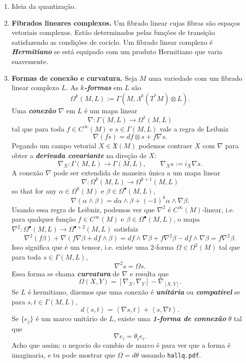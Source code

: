\begin{enumerate}
\begin{proof}\leavevmode
\begin{align*}
	\frac{d}{dt}\left<A\psi(t),\psi(t)\right>&=\left<\frac{1}{i\hslash}A\hat{H}\psi,\psi\right>+\left<A\psi,\frac{1}{i\hslash}\hat{H}\psi\right>=\frac{1}{i\hslash}\left<[A,\hat{H}]\psi,\psi\right>
\end{align*}
já que o produto é hermitiano, i.e. em particular, antilinear na segunda entrada.
\end{proof}
Isso justifica que o commutador é o análogo do colchete de Poisson.
\item Ideia da quantização.
\item \textbf{Fibrados lineares complexos.} Um fibrado linear cujas fibras são espaços vetoriais complexos. Estão determinados pelas funções de transição satisfazendo as condições de cociclo. Um fibrado linear complexo é \textit{\textbf{Hermitiano}} se está equipado com um produto Hermitiano que varia suavemente.
\item \textbf{Formas de conexão e curvatura.} Seja $M$ uma variedade com um fibrado linear complexo $L$. As \textit{\textbf{$k$-formas}} em $L$ são
	\[\Omega^{k}(M,L):=\Gamma(M,\Lambda^{k}(T^*M)\otimes L).\]
Uma \textit{\textbf{conexão}} $\nabla$ em $L$ é um mapa linear
\[\nabla:\Gamma(M,L)\to\Omega^{1}(M,L)\]
tal que para toda $f\in C^\infty(M)$ e $s \in \Gamma(M,L)$ vale a regra de Leibniz
\[\nabla(fs)=df\otimes s+f\nabla s.\]
Pegando um campo vetorial $X \in \mathfrak{X}(M)$ podemos contraer $X$ com $\nabla$ para obter a \textit{\textbf{derivada covariante}} na direção de $X$:
\[\nabla_X:\Gamma(M,L)\to \Gamma(M,L), \qquad \nabla_Xs:=i_X\nabla s.\]
A conexão $\nabla$ pode ser extendida de maneira única a um mapa linear
\[\nabla:\Omega^{k}(M,L)\to \Omega^{k+1}(M,L)\]
so that for any $\alpha \in \Omega^{k}(M)$ e $\beta \in \Omega^{\bullet}(M,L)$,
\[\nabla(\alpha\wedge\beta)=d\alpha \wedge \beta+(-1)^k\alpha\wedge\nabla\beta.\]
Usando essa regra de Leibniz, podemos ver que $\nabla^2$ é $C^\infty(M)$-linear, i.e. para qualquer função $f \in C^\infty(M)$ e $\beta\in\Omega^{\bullet}(M,L)$, o mapa $\nabla^2:\Omega^{\bullet}(M,L)\to\Omega^{\bullet+2}(M,L)$ satisfaiz
\[\nabla^2(f\beta)+\nabla(f\nabla\beta+df\wedge\beta)=df\wedge\nabla\beta+f\nabla^2\beta-df\wedge\nabla\beta=f\nabla^2\beta.\]
Isso significa que é um tensor, i.e. existe uma 2-forma $\Omega\in\Omega^{2}(M)$ tal que para toda $s \in \Gamma(M,L)$,
\[\nabla^2s=\Omega s.\]
Essa forma se chama \textit{\textbf{curvatura}} de $\nabla$ e resulta que
\[\Omega(X,Y)=[\nabla_X,\nabla_Y]-\nabla_{[X,Y]}.\]
Se $L$ é hermitiano, dizemos que uma conexão é \textit{\textbf{unitária}} ou \textit{\textbf{compatível}} se para $s,t\in \Gamma(M,L)$,
\[d\left<s,t\right>=\left<\nabla s,t\right>+\left<s,\nabla t\right>.\]
Se $\{e_j\}$ é um marco unitário de $L$, existe uma \textit{\textbf{1-forma de connexão}} $\theta$ tal que
\[\nabla e_i=\theta_ie_i.\]
Acho que assim: o negocio do cambio de marco é para ver que a forma é imaginaria, e tu pode mostrar que $\Omega=d\theta$ ussando \texttt{hallq.pdf}.



	
\end{enumerate}



